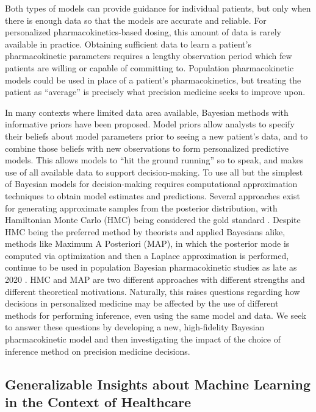 Both types of  models can provide guidance for individual patients, but only when there is enough data so that the models are accurate and reliable. For personalized pharmacokinetics-based dosing, this amount of data is rarely available in practice.  Obtaining sufficient data to learn a patient’s pharmacokinetic parameters requires a lengthy observation period which few patients are willing or capable of committing to. Population pharmacokinetic models could be used in place of a patient’s pharmacokinetics, but treating the patient as “average” is precisely what precision medicine seeks to improve upon.

In many contexts where limited data area available, Bayesian methods with informative priors have been proposed.  Model priors allow analysts to specify their beliefs about model parameters prior to seeing a new patient's data, and to combine those beliefs with new observations to form personalized predictive models.  This allows models to ``hit the ground running'' so to speak, and makes use of all available data to support decision-making.  To use all but the simplest of Bayesian models for decision-making requires computational approximation techniques to obtain model estimates and predictions. Several approaches exist for generating approximate samples from the posterior distribution, with Hamiltonian Monte Carlo (HMC) being considered the gold standard \cite{Neal1996-vn, Matthew_D_Hoffman2014-in, Carpenter2017-qf, Tripuraneni2017-oh}. Despite HMC being the preferred method by theorists and applied Bayesians alike, methods like Maximum A Posteriori (MAP), in which the posterior mode is computed via optimization and then a Laplace approximation is performed, continue to be used in population Bayesian pharmacokinetic studies as late as 2020 \cite{Brooks2016-li, Nguyen2016-pg,  Preijers2019-kc,Stifft2020-uq}. HMC and MAP are two different approaches with different strengths and different theoretical motivations. Naturally, this raises questions regarding how decisions in personalized medicine may be affected by the use of different methods for performing inference, even using the same model and data. We seek to answer these questions by developing a new, high-fidelity Bayesian pharmacokinetic model and then investigating the impact of the choice of inference method on precision medicine decisions. 

\subsection*{Generalizable Insights about Machine Learning in the Context of Healthcare}

